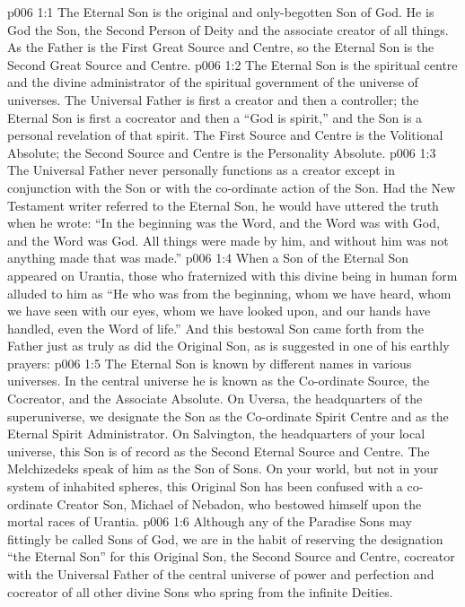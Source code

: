 \vs p006 1:1 The Eternal Son is the original and only\hyp{}begotten Son of God. He is God the Son, the Second Person of Deity and the associate creator of all things. As the Father is the First Great Source and Centre, so the Eternal Son is the Second Great Source and Centre.
\vs p006 1:2 The Eternal Son is the spiritual centre and the divine administrator of the spiritual government of the universe of universes. The Universal Father is first a creator and then a controller; the Eternal Son is first a cocreator and then a  “God is spirit,” and the Son is a personal revelation of that spirit. The First Source and Centre is the Volitional Absolute; the Second Source and Centre is the Personality Absolute.
\vs p006 1:3 The Universal Father never personally functions as a creator except in conjunction with the Son or with the co\hyp{}ordinate action of the Son. Had the New Testament writer referred to the Eternal Son, he would have uttered the truth when he wrote: “In the beginning was the Word, and the Word was with God, and the Word was God. All things were made by him, and without him was not anything made that was made.”
\vs p006 1:4 When a Son of the Eternal Son appeared on Urantia, those who fraternized with this divine being in human form alluded to him as “He who was from the beginning, whom we have heard, whom we have seen with our eyes, whom we have looked upon, and our hands have handled, even the Word of life.” And this bestowal Son came forth from the Father just as truly as did the Original Son, as is suggested in one of his earthly prayers: 
\vs p006 1:5 \pc The Eternal Son is known by different names in various universes. In the central universe he is known as the Co\hyp{}ordinate Source, the Cocreator, and the Associate Absolute. On Uversa, the headquarters of the superuniverse, we designate the Son as the Co\hyp{}ordinate Spirit Centre and as the Eternal Spirit Administrator. On Salvington, the headquarters of your local universe, this Son is of record as the Second Eternal Source and Centre. The Melchizedeks speak of him as the Son of Sons. On your world, but not in your system of inhabited spheres, this Original Son has been confused with a co\hyp{}ordinate Creator Son, Michael of Nebadon, who bestowed himself upon the mortal races of Urantia.
\vs p006 1:6 Although any of the Paradise Sons may fittingly be called Sons of God, we are in the habit of reserving the designation “the Eternal Son” for this Original Son, the Second Source and Centre, cocreator with the Universal Father of the central universe of power and perfection and cocreator of all other divine Sons who spring from the infinite Deities.
